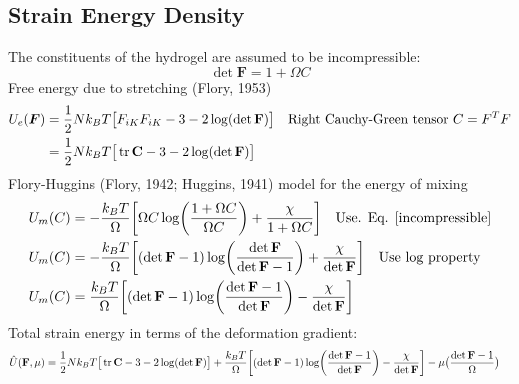 \documentclass[12pt,3p]{article}
\numberwithin{equation}{section}
\begin{document}
\subsection{Strain Energy Density}
The constituents of the hydrogel are assumed to be incompressible: 
\begin{equation}\label{incompressible}
\det \mathbf{F} = 1 + \Omega C 
\end{equation}
Free energy due to stretching (Flory, 1953)
\begin{align}\label{Stretch}
\begin{split}
U_e (\boldsymbol{F}) &= \frac{1}{2} N k_B T \big[ F_{iK} F_{iK} - 3 - 2 \log (\det \mathbf{F}) \big] \quad \text{Right Cauchy-Green tensor } C = F^T F \\
				&=  \frac{1}{2} N k_B T \big[ \tr \mathbf{C} - 3 - 2 \log (\det \mathbf{F}) \big] 
\end{split}
\end{align}
Flory-Huggins (Flory, 1942; Huggins, 1941) model for the energy of mixing 
\begin{align}\label{Mix}
\begin{split}
U_m(C) &= - \frac{k_B T}{\Omega} \bigg[ \Omega C \log(\frac{1 + \Omega C}{\Omega C}) + \frac{\chi}{1 + \Omega C} \bigg] \quad \text{Use. Eq. \ref{incompressible}} \\
U_m(C) &= - \frac{k_B T}{\Omega} \bigg[ (\det \mathbf{F} - 1) \log(\frac{\det \mathbf{F}}{\det \mathbf{F} - 1}) + \frac{\chi}{\det \mathbf{F}} \bigg] \quad \text{Use log property}\\
U_m(C) &= \frac{k_B T}{\Omega} \bigg[ (\det \mathbf{F} - 1) \log (\frac{\det \mathbf{F} - 1}{\det \mathbf{F}}) - \frac{\chi}{\det \mathbf{F}} \bigg] 
\end{split}
\end{align}
Total strain energy in terms of the deformation gradient: 
\begin{align*}
\hat{U} (\mathbf{F}, \mu) &= \frac{1}{2} N k_B T \big[ \tr \mathbf{C} - 3 - 2 \log (\det \mathbf{F}) \big] + \frac{k_B T}{\Omega} \bigg[ (\det \mathbf{F} - 1) \log (\frac{\det \mathbf{F} - 1}{\det \mathbf{F}}) - \frac{\chi}{\det \mathbf{F}} \bigg] - \mu \big(\frac{\det \mathbf{F} - 1}{\Omega} \big)
\end{align*}

\end{document}
